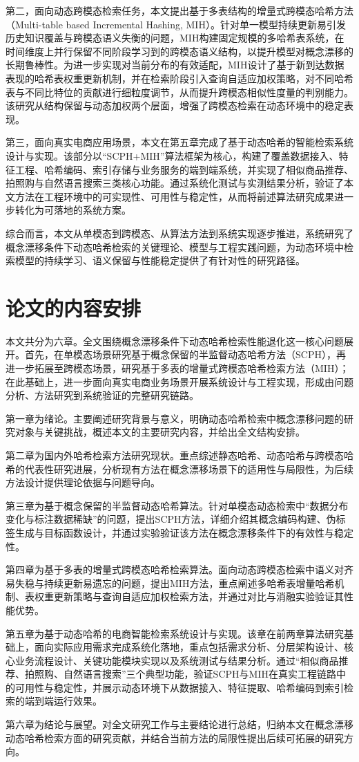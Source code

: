 第二，面向动态跨模态检索任务，本文提出基于多表结构的增量式跨模态哈希方法（Multi-table based Incremental Hashing, MIH）。针对单一模型持续更新易引发历史知识覆盖与跨模态语义失衡的问题，MIH构建固定规模的多哈希表系统，在时间维度上并行保留不同阶段学习到的跨模态语义结构，以提升模型对概念漂移的长期鲁棒性。为进一步实现对当前分布的有效适配，MIH设计了基于新到达数据表现的哈希表权重更新机制，并在检索阶段引入查询自适应加权策略，对不同哈希表与不同比特位的贡献进行细粒度调节，从而提升跨模态相似性度量的判别能力。该研究从结构保留与动态加权两个层面，增强了跨模态检索在动态环境中的稳定表现。

第三，面向真实电商应用场景，本文在第五章完成了基于动态哈希的智能检索系统设计与实现。该部分以“SCPH+MIH”算法框架为核心，构建了覆盖数据接入、特征工程、哈希编码、索引存储与业务服务的端到端系统，并实现了相似商品推荐、拍照购与自然语言搜索三类核心功能。通过系统化测试与实测结果分析，验证了本文方法在工程环境中的可实现性、可用性与稳定性，从而将前述算法研究成果进一步转化为可落地的系统方案。

综合而言，本文从单模态到跨模态、从算法方法到系统实现逐步推进，系统研究了概念漂移条件下动态哈希检索的关键理论、模型与工程实践问题，为动态环境中检索模型的持续学习、语义保留与性能稳定提供了有针对性的研究路径。
\section{论文的内容安排}
本文共分为六章。全文围绕概念漂移条件下动态哈希检索性能退化这一核心问题展开。首先，在单模态场景研究基于概念保留的半监督动态哈希方法（SCPH），再进一步拓展至跨模态场景，研究基于多表的增量式跨模态哈希检索方法（MIH）；在此基础上，进一步面向真实电商业务场景开展系统设计与工程实现，形成由问题分析、方法研究到系统验证的完整研究链路。

第一章为绪论。主要阐述研究背景与意义，明确动态哈希检索中概念漂移问题的研究对象与关键挑战，概述本文的主要研究内容，并给出全文结构安排。

第二章为国内外哈希检索方法研究现状。重点综述静态哈希、动态哈希与跨模态哈希的代表性研究进展，分析现有方法在概念漂移场景下的适用性与局限性，为后续方法设计提供理论依据与问题导向。

第三章为基于概念保留的半监督动态哈希算法。针对单模态动态检索中“数据分布变化与标注数据稀缺”的问题，提出SCPH方法，详细介绍其概念编码构建、伪标签生成与目标函数设计，并通过实验验证该方法在概念漂移条件下的有效性与稳定性。

第四章为基于多表的增量式跨模态哈希检索算法。面向动态跨模态检索中语义对齐易失稳与持续更新易遗忘的问题，提出MIH方法，重点阐述多哈希表增量哈希机制、表权重更新策略与查询自适应加权检索方法，并通过对比与消融实验验证其性能优势。

第五章为基于动态哈希的电商智能检索系统设计与实现。该章在前两章算法研究基础上，面向实际应用需求完成系统化落地，重点包括需求分析、分层架构设计、核心业务流程设计、关键功能模块实现以及系统测试与结果分析。通过“相似商品推荐、拍照购、自然语言搜索”三个典型功能，验证SCPH与MIH在真实工程链路中的可用性与稳定性，并展示动态环境下从数据接入、特征提取、哈希编码到索引检索的端到端运行效果。

第六章为结论与展望。对全文研究工作与主要结论进行总结，归纳本文在概念漂移动态哈希检索方面的研究贡献，并结合当前方法的局限性提出后续可拓展的研究方向。
